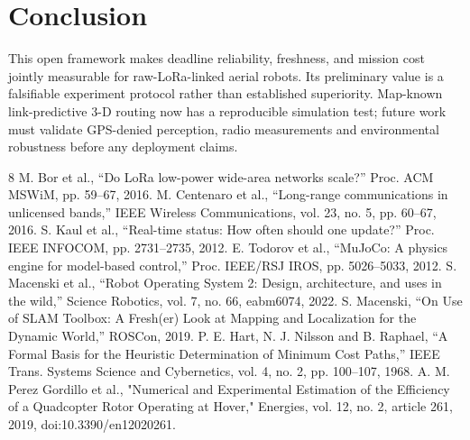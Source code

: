 \documentclass[conference]{IEEEtran}
\begin{document}
\section{Conclusion}
This open framework makes deadline reliability, freshness, and mission cost jointly measurable for raw-LoRa-linked aerial robots. Its preliminary value is a falsifiable experiment protocol rather than established superiority. Map-known link-predictive 3-D routing now has a reproducible simulation test; future work must validate GPS-denied perception, radio measurements and environmental robustness before any deployment claims.
\begin{thebibliography}{8}
 M. Bor et al., ``Do LoRa low-power wide-area networks scale?'' Proc. ACM MSWiM, pp. 59--67, 2016.
 M. Centenaro et al., ``Long-range communications in unlicensed bands,'' IEEE Wireless Communications, vol. 23, no. 5, pp. 60--67, 2016.
 S. Kaul et al., ``Real-time status: How often should one update?'' Proc. IEEE INFOCOM, pp. 2731--2735, 2012.
 E. Todorov et al., ``MuJoCo: A physics engine for model-based control,'' Proc. IEEE/RSJ IROS, pp. 5026--5033, 2012.
 S. Macenski et al., ``Robot Operating System 2: Design, architecture, and uses in the wild,'' Science Robotics, vol. 7, no. 66, eabm6074, 2022.
 S. Macenski, ``On Use of SLAM Toolbox: A Fresh(er) Look at Mapping and Localization for the Dynamic World,'' ROSCon, 2019.
 P. E. Hart, N. J. Nilsson and B. Raphael, ``A Formal Basis for the Heuristic Determination of Minimum Cost Paths,'' IEEE Trans. Systems Science and Cybernetics, vol. 4, no. 2, pp. 100--107, 1968.
 A. M. Perez Gordillo et al., "Numerical and Experimental Estimation of the Efficiency of a Quadcopter Rotor Operating at Hover," Energies, vol. 12, no. 2, article 261, 2019, doi:10.3390/en12020261.
\end{thebibliography}
\end{document}
